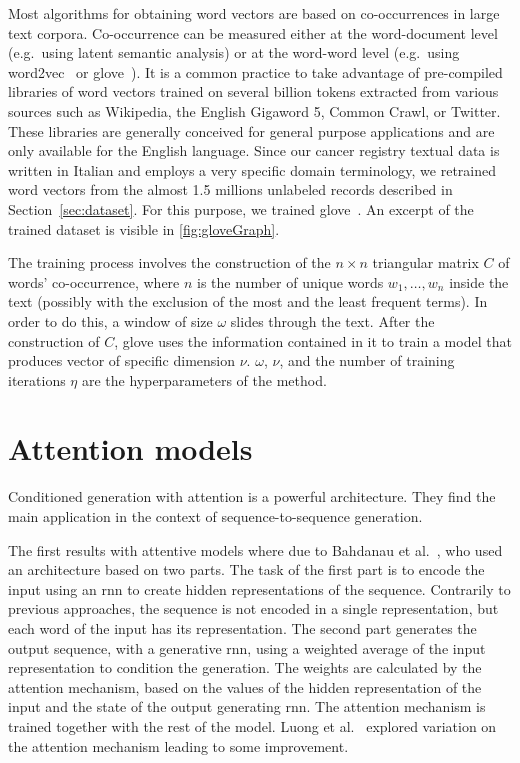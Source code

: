 Most algorithms for obtaining word vectors are based on co-occurrences
in large text corpora. Co-occurrence can be measured either at the
word-document level (e.g.\ using latent semantic analysis) or at the
word-word level (e.g.\ using word2vec~\cite{mikolov_linguistic_2013}
or \ac{glove}~\cite{pennington_glove:_2014}). It is a common practice to
take advantage of pre-compiled libraries of word vectors trained on
several billion tokens extracted from various sources such as
Wikipedia, the English Gigaword 5, Common Crawl, or Twitter. These
libraries are generally conceived for general purpose applications and
are only available for the English language. Since our cancer registry
textual data is written in Italian and employs a very specific domain
terminology, we retrained word vectors from the almost 1.5 millions
unlabeled records described in Section~\ref{sec:dataset}. For this
purpose, we trained \ac{glove}~\cite{pennington_glove:_2014}. An
excerpt of the trained dataset is visible in \cref{fig:gloveGraph}.

The training process involves the construction of the
$n\times n$ triangular matrix $C$ of words' co-occurrence, where $n$ is
the number of unique words $w_1,\dots,w_n$ inside the text (possibly
with the exclusion of the
  most and the least frequent terms). In order to do this, a window of
size $\omega$ slides
through the text. After the construction of $C$, \ac{glove} uses the
information contained in it to train a model that produces vector of
specific dimension $\nu$. $\omega$, $\nu$, and the number of
training iterations $\eta$ are the hyperparameters of the method. 

\section{Attention models}
Conditioned generation with attention is a powerful architecture. They
find the main application in the context of sequence-to-sequence
generation.

The first results with attentive models where due to Bahdanau et al.\
\cite{bahdanau_neural_2014}, who used an architecture based on two
parts. The task of the first part is to encode the input using an
\ac{rnn} to create hidden representations of the sequence. Contrarily
to previous approaches, the sequence is not encoded in a single
representation, but each word of the input has its
representation. The second part generates the output
sequence, with a generative \ac{rnn}, using a weighted average of the
input representation to condition the generation. The weights are
calculated by the attention mechanism, based on the values of the
hidden representation of the input and the state of the output
generating \ac{rnn}. The attention mechanism is trained together with
the rest of the model. Luong et al.\ \cite{luong2015effective}
explored variation on the attention mechanism leading to some
improvement.

